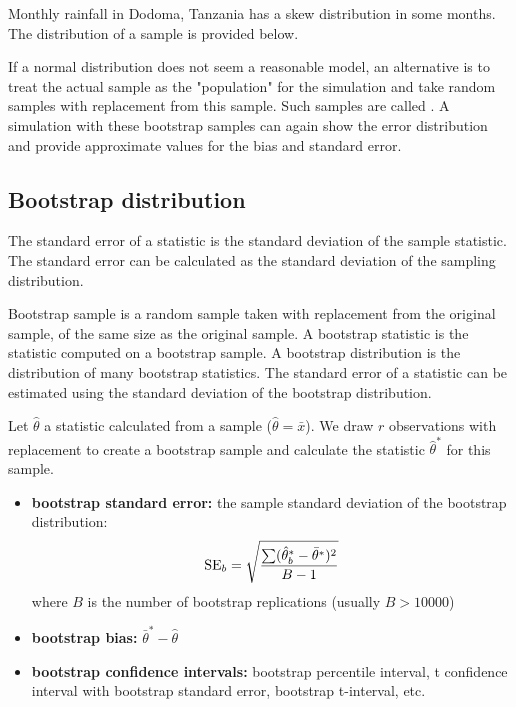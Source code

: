 \begin{example}
	Monthly rainfall in Dodoma, Tanzania has a skew distribution in some months. The distribution of a sample is provided below.
	
	
	
	If a normal distribution does not seem a reasonable model, an alternative is to treat the actual sample as the "population" for the simulation and take random samples with replacement from this sample. Such samples are called . A simulation with these bootstrap samples can again show the error distribution and provide approximate values for the bias and standard error.
	
	
	
\end{example}

\subsection{Bootstrap distribution}

The standard error of a statistic is the standard deviation of the sample statistic. The standard error can be calculated as the standard deviation of the sampling distribution.

Bootstrap sample is a random sample taken with replacement from the original sample, of the same size as the original sample. A bootstrap statistic is the statistic computed on a bootstrap sample. A bootstrap distribution is the distribution of many bootstrap statistics. The standard error of a statistic can be estimated using the standard deviation of the bootstrap distribution.

Let $\hat{\theta}$ a statistic calculated from a sample ($\hat{\theta} = \bar{x}$). We draw $r$ observations with replacement to create a bootstrap sample and calculate the statistic $\hat{\theta}^\ast$ for this sample.
\begin{itemize}
	\item \textbf{bootstrap standard error:} the sample standard deviation of the bootstrap distribution:
	\begin{align}
		\operatorname{SE}_b = \sqrt{\frac{\sum (\hat{\theta}^\ast_b - \bar{\theta}^\ast)^2}{B-1}} \notag
	\end{align}
	where $B$ is the number of bootstrap replications (usually $B>10000$)
	\item \textbf{bootstrap bias:} $\bar{\theta}^\ast-\hat{\theta}$
	\item \textbf{bootstrap confidence intervals:} bootstrap percentile interval, t confidence interval with bootstrap standard error, bootstrap t-interval, etc.
\end{itemize}


